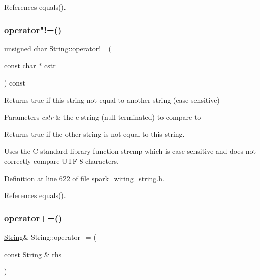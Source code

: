 References equals().

\mbox{\label{class_string_aa3bec091af9c137939b348138ae06e93}} 
\subsubsection{\texorpdfstring{operator"!=()}{operator!=()}\hspace{0.1cm}{\footnotesize\ttfamily [2/2]}}
{\footnotesize\ttfamily unsigned char String\+::operator!= (\begin{DoxyParamCaption}\item[{const char $\ast$}]{cstr }\end{DoxyParamCaption}) const\hspace{0.3cm}{\ttfamily [inline]}}



Returns true if this string not equal to another string (case-\/sensitive) 


\begin{DoxyParams}{Parameters}
{\em cstr} & the c-\/string (null-\/terminated) to compare to\\
\hline
\end{DoxyParams}
\begin{DoxyReturn}{Returns}
true if the other string is not equal to this string.
\end{DoxyReturn}
Uses the C standard library function strcmp which is case-\/sensitive and does not correctly compare U\+T\+F-\/8 characters. 

Definition at line 622 of file spark\+\_\+wiring\+\_\+string.\+h.



References equals().

\mbox{\label{class_string_a5a3f29c49cc46fb598fc41767a83dabc}} 
\subsubsection{\texorpdfstring{operator+=()}{operator+=()}\hspace{0.1cm}{\footnotesize\ttfamily [1/8]}}
{\footnotesize\ttfamily \hyperlink{class_string}{String}\& String\+::operator+= (\begin{DoxyParamCaption}\item[{const \hyperlink{class_string}{String} \&}]{rhs }\end{DoxyParamCaption})\hspace{0.3cm}{\ttfamily [inline]}}



